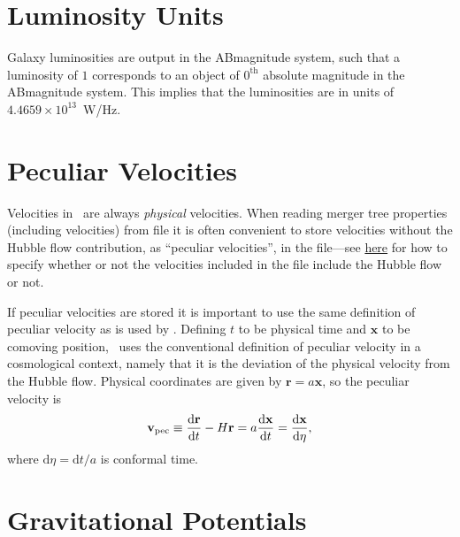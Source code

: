 \section{Luminosity Units}

Galaxy luminosities are output in the \gls{ABmagnitude} system, such that a luminosity of $1$ corresponds to an object of $0^\mathrm{th}$ absolute magnitude in the \gls{ABmagnitude} system. This implies that the luminosities are in units of $4.4659\times 10^{13}$~W/Hz.

\section{Peculiar Velocities}\label{sec:GalacticusVelocityDefinitions}

Velocities in \glc\ are always \emph{physical} velocities. When reading merger tree properties (including velocities) from file it is often convenient to store velocities without the Hubble flow contribution, as ``peculiar velocities'', in the file---see \href{https://github.com/galacticusorg/galacticus/wiki/Merger-Tree-File-Format#forest-halos-group}{here} for how to specify whether or not  the velocities included in the file include the Hubble flow or not.

If peculiar velocities are stored it is important to use the same definition of peculiar velocity as is used by \glc. Defining $t$ to be physical time and $\mathbf{x}$ to be comoving position, \glc\ uses the conventional definition of peculiar velocity in a cosmological context, namely that it is the deviation of the physical velocity from the Hubble flow. Physical coordinates are given by $\mathbf{r} = a\mathbf{x}$, so the peculiar velocity is
\begin{equation}
\mathbf{v}_\mathrm{pec} \equiv {\mathrm{d} \mathbf{r} \over \mathrm{d} t} - H \mathbf{r} = a {\mathrm{d} \mathbf{x}\over\mathrm{d} t} = {\mathrm{d}\mathbf{x}\over\mathrm{d}\eta},
\end{equation}
where $\mathrm{d}\eta = \mathrm{d}t/a$ is conformal time. 

\section{Gravitational Potentials}

